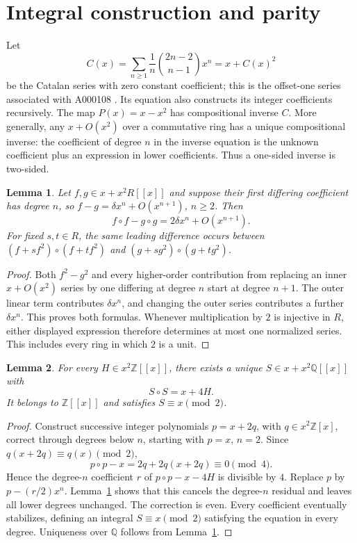 \documentclass[11pt]{article}
\newtheorem{lemma}{Lemma}
\newcommand{\Z}{\mathbb Z}
\newcommand{\Q}{\mathbb Q}
\begin{document}
\section{Integral construction and parity}
Let
\[
 C(x)=\sum_{n\geq1}\frac1n\binom{2n-2}{n-1}x^n
       =x+C(x)^2
\]
be the Catalan series with zero constant coefficient; this is the offset-one series associated with A000108 \cite{catalan}. Its equation also constructs its integer coefficients recursively. The map $P(x)=x-x^2$ has compositional inverse $C$. More generally, any $x+O(x^2)$ over a commutative ring has a unique compositional inverse: the coefficient of degree $n$ in the inverse equation is the unknown coefficient plus an expression in lower coefficients. Thus a one-sided inverse is two-sided.

\begin{lemma}\label{leading}
Let $f,g\in x+x^2R[[x]]$ and suppose their first differing coefficient has degree $n$, so $f-g=\delta x^n+O(x^{n+1})$, $n\geq2$. Then
\[
 f\circ f-g\circ g=2\delta x^n+O(x^{n+1}).
\]
For fixed $s,t\in R$, the same leading difference occurs between
$(f+sf^2)\circ(f+tf^2)$ and $(g+sg^2)\circ(g+tg^2)$.
\end{lemma}
\begin{proof}
Both $f^2-g^2$ and every higher-order contribution from replacing an inner $x+O(x^2)$ series by one differing at degree $n$ start at degree $n+1$. The outer linear term contributes $\delta x^n$, and changing the outer series contributes a further $\delta x^n$. This proves both formulas. Whenever multiplication by $2$ is injective in $R$, either displayed expression therefore determines at most one normalized series. This includes every ring in which $2$ is a unit.
\end{proof}

\begin{lemma}\label{root}
For every $H\in x^2\Z[[x]]$, there exists a unique $S\in x+x^2\Q[[x]]$ with
\[
 S\circ S=x+4H.
\]
It belongs to $\Z[[x]]$ and satisfies $S\equiv x\pmod2$.
\end{lemma}
\begin{proof}
Construct successive integer polynomials $p=x+2q$, with $q\in x^2\Z[x]$, correct through degrees below $n$, starting with $p=x$, $n=2$. Since $q(x+2q)\equiv q(x)\pmod2$,
\[
 p\circ p-x=2q+2q(x+2q)\equiv0\pmod4.
\]
Hence the degree-$n$ coefficient $r$ of $p\circ p-x-4H$ is divisible by $4$. Replace $p$ by $p-(r/2)x^n$. Lemma~\ref{leading} shows that this cancels the degree-$n$ residual and leaves all lower degrees unchanged. The correction is even. Every coefficient eventually stabilizes, defining an integral $S\equiv x\pmod2$ satisfying the equation in every degree. Uniqueness over $\Q$ follows from Lemma~\ref{leading}.
\end{proof}
\end{document}
